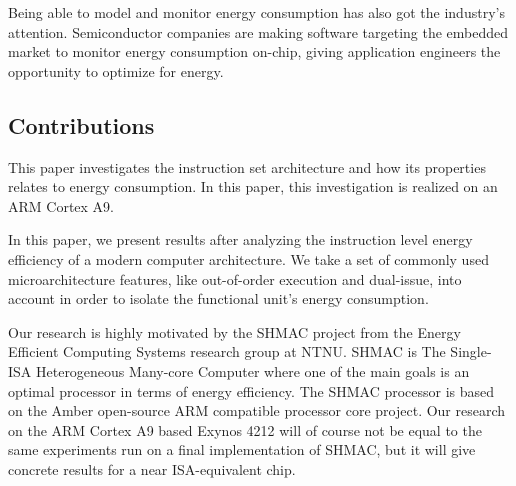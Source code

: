 Being able to model and monitor energy consumption has also got the industry's
attention. Semiconductor companies are making software targeting the embedded
market to monitor energy consumption on-chip, giving application engineers the
opportunity to optimize for energy.



\subsection{Contributions}
This paper investigates the instruction set architecture and how its properties
relates to energy consumption. In this paper, this investigation is realized on
an ARM Cortex A9.

In this paper, we present results after analyzing the instruction level energy
efficiency of a modern computer architecture. We take a set of commonly used
microarchitecture features, like out-of-order execution and dual-issue, into
account in order to isolate the functional unit's energy consumption.


Our research is highly motivated by the SHMAC project from the Energy Efficient
Computing Systems research group at NTNU. SHMAC is The Single-ISA Heterogeneous
Many-core Computer where one of the main goals is an optimal processor in terms
of energy efficiency. The SHMAC processor is based on the Amber open-source ARM
compatible processor core project. Our research on the ARM Cortex A9
based Exynos 4212 will of course not be equal to the same experiments run on
a final implementation of SHMAC, but it will give concrete results for a near
ISA-equivalent chip.

